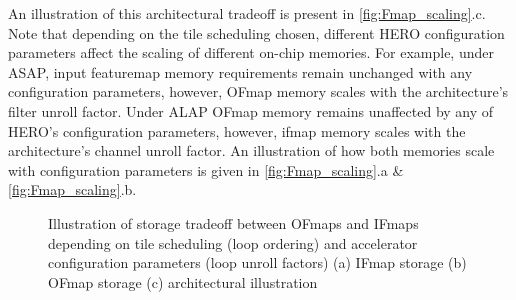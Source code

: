 An illustration of this architectural tradeoff is present
in \autoref{fig:Fmap_scaling}.c. Note that depending on the tile scheduling
chosen, different HERO configuration parameters affect the scaling of different
on-chip memories. For example, under ASAP, input featuremap memory requirements
remain unchanged with any configuration parameters, however, OFmap memory scales
with the architecture's filter unroll factor. Under ALAP OFmap memory remains
unaffected by any of HERO's configuration parameters, however, ifmap memory scales
with the architecture's channel unroll factor. An illustration of how both
memories scale with configuration parameters is given in
\autoref{fig:Fmap_scaling}.a \& \autoref{fig:Fmap_scaling}.b. 

\begin{figure}
    \centering
    \hspace{0.1cm} 
    \caption{Illustration of storage tradeoff between OFmaps and IFmaps depending on tile scheduling (loop ordering) and accelerator configuration parameters (loop unroll factors) (a) IFmap storage (b) OFmap storage (c) architectural illustration}
    \label{fig:Fmap_scaling}
\end{figure}

